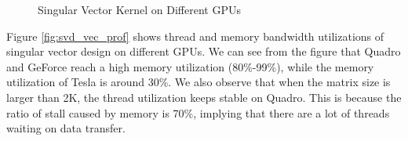 \begin{figure}[hbpt]
\vspace{-0.3in}
\centering
\vspace{-0.1in}
  \caption{Singular Vector Kernel on Different GPUs}
  \label{fig:svdvec}
\vspace{-0.3in}
\end{figure}

Figure \ref{fig:svd_vec_prof} shows thread and memory bandwidth utilizations of singular vector design on different GPUs. 
We can see from the figure that Quadro and GeForce reach a high memory utilization (80\%-99\%), while the memory utilization of Tesla is around 30\%. 
We also observe that when the matrix size is larger than 2K, the thread utilization keeps stable on Quadro. 
This is because the ratio of stall caused by memory is 70\%, implying that there are a lot of threads waiting on data transfer.
\fi 


